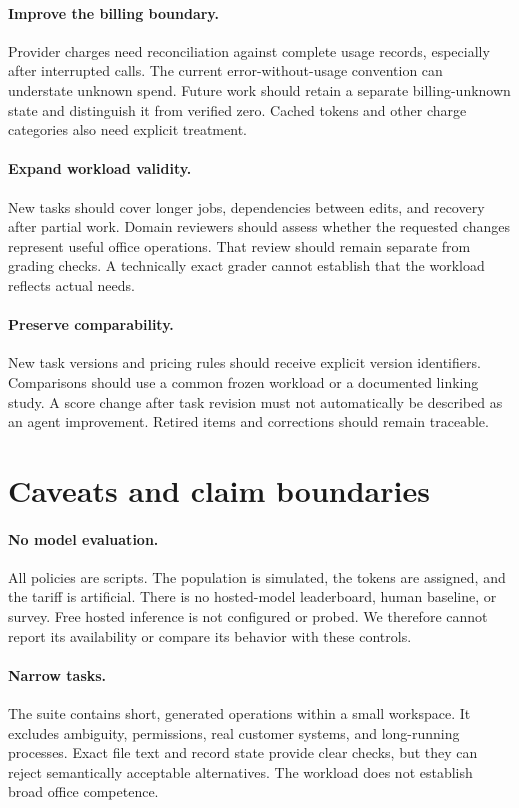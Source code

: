 \documentclass{article}
\begin{document}
\paragraph{Improve the billing boundary.} Provider charges need reconciliation against complete usage records, especially after interrupted calls. The current error-without-usage convention can understate unknown spend. Future work should retain a separate billing-unknown state and distinguish it from verified zero. Cached tokens and other charge categories also need explicit treatment.
\paragraph{Expand workload validity.} New tasks should cover longer jobs, dependencies between edits, and recovery after partial work. Domain reviewers should assess whether the requested changes represent useful office operations. That review should remain separate from grading checks. A technically exact grader cannot establish that the workload reflects actual needs.
\paragraph{Preserve comparability.} New task versions and pricing rules should receive explicit version identifiers. Comparisons should use a common frozen workload or a documented linking study. A score change after task revision must not automatically be described as an agent improvement. Retired items and corrections should remain traceable.
\section{Caveats and claim boundaries}
\paragraph{No model evaluation.} All policies are scripts. The population is simulated, the tokens are assigned, and the tariff is artificial. There is no hosted-model leaderboard, human baseline, or survey. Free hosted inference is not configured or probed. We therefore cannot report its availability or compare its behavior with these controls.
\paragraph{Narrow tasks.} The suite contains short, generated operations within a small workspace. It excludes ambiguity, permissions, real customer systems, and long-running processes. Exact file text and record state provide clear checks, but they can reject semantically acceptable alternatives. The workload does not establish broad office competence.
\end{document}
